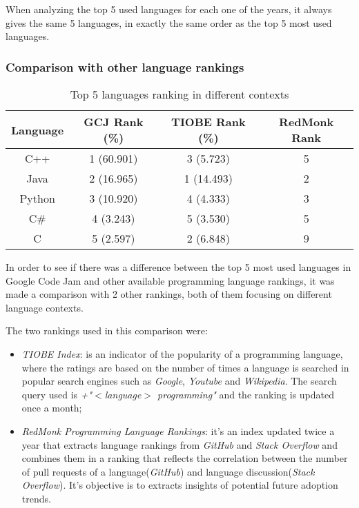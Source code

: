 \documentclass{article}
\begin{document}
\begin{multicols*}{2}
When analyzing the top 5 used languages for each one of the years, it always gives the same 5 languages, in exactly the same order as the top 5 most used languages.


\subsubsection{Comparison with other language rankings}

\begin{table*}[!ht]
\centering
\caption{Top 5 languages ranking in different contexts}
\label{diff_contexts}
\begin{tabular}{c|c|c|c}
\textbf{Language} & \textbf{GCJ Rank (\%)} & \textbf{TIOBE Rank (\%)} & \textbf{RedMonk Rank} \\ \hline
C++               & 1 (60.901)             & 3 (5.723)                & 5                     \\
Java              & 2 (16.965)             & 1 (14.493)               & 2                     \\
Python            & 3 (10.920)             & 4 (4.333)                & 3                     \\
C\#               & 4 (3.243)              & 5 (3.530)                & 5                     \\
C                 & 5 (2.597)              & 2 (6.848)                & 9
\end{tabular}
\end{table*}

In order to see if there was a difference between the top 5 most used languages in Google Code Jam and other available programming language rankings, it was made a comparison with 2 other rankings, both of them focusing on different language contexts.

The two rankings used in this comparison were:
\begin{itemize}
    \item \textit{TIOBE Index}: is an indicator of the popularity of a programming language\cite{tiobe}, where the ratings are based on the number of times a language is searched in popular search engines such as \textit{Google}, \textit{Youtube} and \textit{Wikipedia}. The search query used is \textit{+"$<$language$>$ programming"} and the ranking is updated once a month;
    \item \textit{RedMonk Programming Language Rankings}: it's an index updated twice a year that extracts language rankings from \textit{GitHub} and \textit{Stack Overflow} and combines them in a ranking that reflects the correlation between the number of pull requests of a language(\textit{GitHub}) and language discussion(\textit{Stack Overflow})\cite{redmonk}. It's objective is to extracts insights of potential future adoption trends.
\end{itemize}



\end{multicols*}
\end{document}
